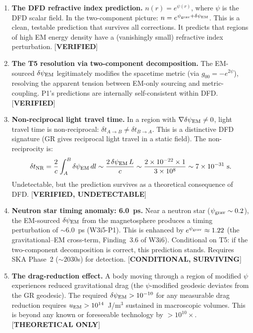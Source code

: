 \documentclass[11pt]{article}
\newcommand{\ee}[1]{\times 10^{#1}}
\newcommand{\psigrav}{\psi_{\rm grav}}
\newcommand{\dpsiEM}{\delta\psi_{\rm EM}}
\theoremstyle{definition}
\theoremstyle{remark}
\begin{document}
\begin{tcolorbox}[colback=green!3!white, colframe=green!50!black,
  title=\textbf{P1: What Survives (Theory Only)}]

\begin{enumerate}[label=\textbf{S\arabic*.}, itemsep=4pt]

\item \textbf{The DFD refractive index prediction.}
  $n(r) = e^{\psi(r)}$, where $\psi$ is the DFD scalar field.
  In the two-component picture: $n = e^{\psigrav + \dpsiEM}$.
  This is a clean, testable prediction that survives all corrections.
  It predicts that regions of high EM energy density have a
  (vanishingly small) refractive index perturbation. [\textbf{VERIFIED}]

\item \textbf{The T5 resolution via two-component decomposition.}
  The EM-sourced $\dpsiEM$ legitimately modifies the spacetime metric
  (via $g_{00} = -e^{2\psi}$), resolving the apparent tension between
  EM-only sourcing and metric-coupling. P1's predictions are
  internally self-consistent within DFD. [\textbf{VERIFIED}]

\item \textbf{Non-reciprocal light travel time.}
  In a region with $\nabla\dpsiEM \neq 0$, light travel time
  is non-reciprocal: $\delta t_{A\to B} \neq \delta t_{B\to A}$.
  This is a distinctive DFD signature (GR gives reciprocal
  light travel in a static field). The non-reciprocity is:
  \begin{equation}
  \delta t_{\rm NR} = \frac{2}{c}\int_A^B \dpsiEM\,dl
  \sim \frac{2\,\dpsiEM\,L}{c} \sim \frac{2\times 10^{-22}\times 1}
  {3\ee{8}} \sim 7\ee{-31}~\text{s}.
  \end{equation}
  Undetectable, but the prediction survives as a theoretical
  consequence of DFD. [\textbf{VERIFIED, UNDETECTABLE}]

\item \textbf{Neutron star timing anomaly: 6.0~ps.}
  Near a neutron star ($\psigrav \sim 0.2$), the EM-sourced
  $\dpsiEM$ from the magnetosphere produces a timing perturbation
  of $\sim 6.0$~ps (W3i5-P1). This is enhanced by $e^{\psigrav}
  \approx 1.22$ (the gravitational--EM cross-term, Finding~3.6 of
  W3i6). Conditional on T5: if the two-component decomposition is
  correct, this prediction stands. Requires SKA Phase~2
  ($\sim 2030$s) for detection. [\textbf{CONDITIONAL, SURVIVING}]

\item \textbf{The drag-reduction effect.}
  A body moving through a region of modified $\psi$ experiences
  reduced gravitational drag (the $\psi$-modified geodesic deviates
  from the GR geodesic). The required $\dpsiEM > 10^{-10}$ for any
  measurable drag reduction requires $u_{\rm EM} > 10^{14}$~J/m$^3$
  sustained in macroscopic volumes. This is beyond any known or
  foreseeable technology by $>10^{10}\times$.
  [\textbf{THEORETICAL ONLY}]


\end{enumerate}
\end{tcolorbox}
\end{document}

